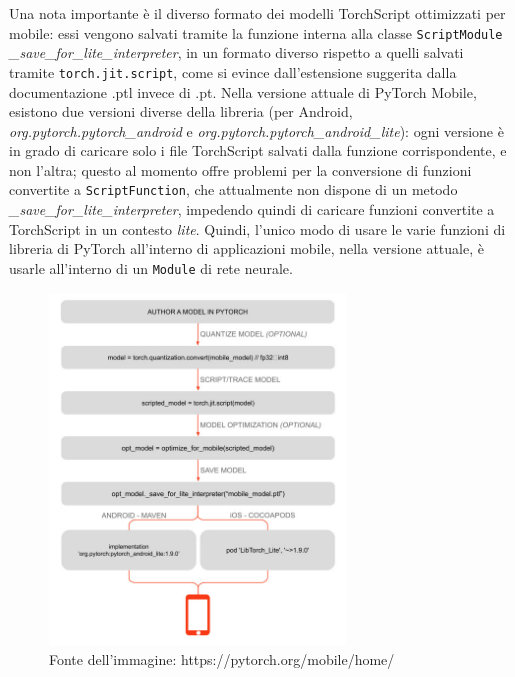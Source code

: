 Una nota importante è il diverso formato dei modelli TorchScript ottimizzati per mobile: 
essi vengono salvati tramite la funzione interna alla classe \texttt{ScriptModule}
\emph{\_save\_for\_lite\_interpreter}, in un formato diverso rispetto a quelli salvati tramite
\texttt{torch.jit.script}, come si evince dall'estensione suggerita dalla documentazione .ptl
invece di .pt. Nella versione attuale di PyTorch Mobile, esistono due versioni diverse della
libreria (per Android, \emph{org.pytorch.pytorch\_android} e 
\emph{org.pytorch.pytorch\_android\_lite}): ogni versione è in grado di caricare solo i file
TorchScript salvati dalla funzione corrispondente, e non l'altra; questo al momento offre
problemi per la conversione di funzioni convertite a \texttt{ScriptFunction}, che attualmente
non dispone di un metodo \emph{\_save\_for\_lite\_interpreter}, impedendo quindi di caricare 
funzioni convertite a TorchScript in un contesto \emph{lite}. Quindi, l'unico modo di usare
le varie funzioni di libreria di PyTorch all'interno di applicazioni mobile, nella versione 
attuale, è usarle all'interno di un \texttt{Module} di rete neurale.

\begin{figure}[!bh]
    \centering
    \includegraphics[width=0.7\textwidth]{img/pytorch_mobile_workflow.jpg}
    \caption{Fonte dell'immagine: https://pytorch.org/mobile/home/}
    \label{fig:workflow_pytorch_mobile}
\end{figure}

\FloatBarrier

